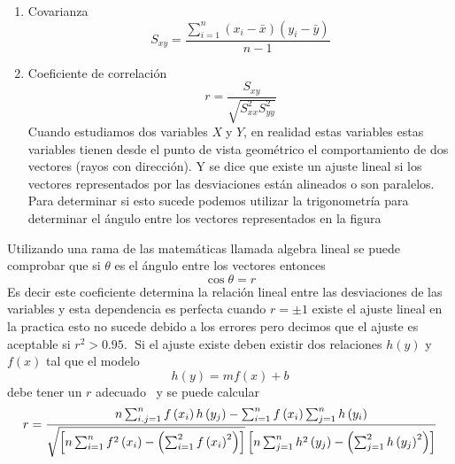 \documentclass[12pt]{article}
\begin{document}
\begin{enumerate}
\begin{enumerate}
\item  Covarianza 
\begin{equation*}
S_{xy}=\frac{\sum_{i=1}^{n}(x_{i}-\bar{x})(y_{i}-\bar{y})}{n-1}
\end{equation*}

\item  Coeficiente de correlaci\'{o}n 
\begin{equation*}
r=\frac{S_{xy}}{\sqrt{S_{xx}^{2}S_{yy}^{2}}}
\end{equation*}
Cuando estudiamos dos variables $X\;$y $Y$, en realidad estas variables
estas variables tienen desde el punto de vista geom\'{e}trico el
comportamiento de dos vectores (rayos con direcci\'{o}n). Y se dice que
existe un ajuste lineal si los vectores representados por las desviaciones
est\'{a}n alineados o son paralelos.\newline
Para determinar si esto sucede podemos utilizar la trigonometr\'{i}a para
determinar el \'{a}ngulo entre los vectores representados en la figura 
\end{enumerate}
\end{enumerate}

Utilizando una rama de las matem\'{a}ticas llamada algebra lineal se puede
comprobar que si $\theta $ es el \'{a}ngulo entre los vectores entonces 
\begin{equation*}
\cos \theta =r
\end{equation*}
Es decir este coeficiente determina la relaci\'{o}n lineal entre las
desviaciones de las variables y esta dependencia es perfecta cuando $r=\pm 1$
existe el ajuste lineal en la practica esto no sucede debido a los errores
pero decimos que el ajuste es aceptable si $r^{2}>0.95.\;$\newline
Si el ajuste existe deben existir dos relaciones $h\left( y\right) $ y $%
f\left( x\right) $ tal que el modelo 
\begin{equation*}
h\left( y\right) =mf\left( x\right) +b
\end{equation*}
debe tener un $r$ adecuado \ y se puede calcular 
\begin{equation*}
r=\frac{n\sum_{i.j=1}^{n}f\left( x_{i}\right) h\left( y_{j}\right)
-\sum_{i=1}^{n}f\left( x_{i}\right) \sum_{j=1}^{n}h\left( y_{i}\right) }{%
\sqrt{\left[ n\sum_{i=1}^{n}f^{2}\left( x_{i}\right) -\left(
\sum_{i=1}^{2}f\left( x_{i}\right) ^{2}\right) \right] }\left[
n\sum_{j=1}^{n}h^{2}\left( y_{j}\right) -\left( \sum_{j=1}^{2}h\left(
y_{j}\right) ^{2}\right) \right] }
\end{equation*}
\end{document}
